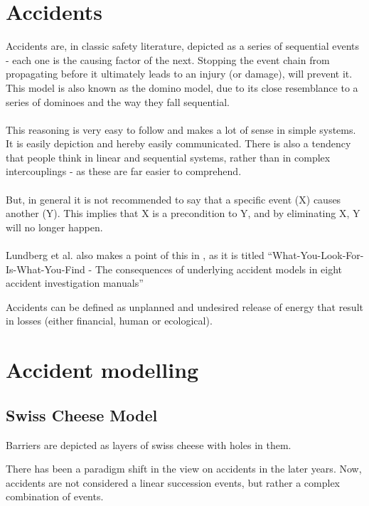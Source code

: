 \section{Accidents}
Accidents are, in classic safety literature, depicted as a series of sequential events - each one is the causing factor of the next. Stopping the event chain from propagating before it ultimately leads to an injury (or damage), will prevent it. This model is also known as the domino model, due to its close resemblance to a series of dominoes and the way they fall sequential.\\
\\
This reasoning is very easy to follow and makes a lot of sense in simple systems. It is easily depiction and hereby easily communicated. There is also a tendency that people think in linear and sequential systems, rather than in complex intercouplings - as these are far easier to comprehend.\\
\\
But, in general it is not recommended to say that a specific event (X) causes another (Y). This implies that X is a precondition to Y, and by eliminating X, Y will no longer happen\cite{sklet2002methods}.\\
\\
Lundberg et al. also makes a point of this in \cite{lundberg2009you}, as it is titled ``What-You-Look-For-Is-What-You-Find - The consequences of underlying accident models in eight accident investigation manuals''

Accidents can be defined as unplanned and undesired release of energy that result in losses (either financial, human or ecological).

\section{Accident modelling}

\subsection{Swiss Cheese Model}

Barriers are depicted as layers of swiss cheese with holes in them. 


There has been a paradigm shift in the view on accidents in the later years. Now, accidents are not considered a linear succession events, but rather a complex combination of events.

